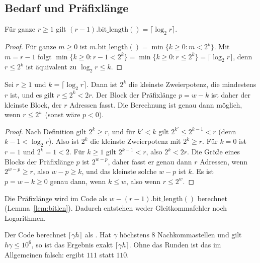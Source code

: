 \subsection{Bedarf und Präfixlänge}

\begin{lemma}
\label{lem:bitlen}
	Für ganze $r \ge 1$ gilt $(r-1).\mathrm{bit\_length}() = \lceil \log_2 r \rceil$.
\end{lemma}

\begin{proof}
	Für ganze $m \ge 0$ ist $m.\mathrm{bit\_length}() = \min\{k \ge 0 : m < 2^k\}$. Mit $m = r-1$ folgt $\min\{k \ge 0: r-1 < 2^k\} = \min\{k \ge 0 : r \le 2^k\} = \lceil \log_2 r \rceil$, denn $r \le 2^k$ ist äquivalent zu $\log_2 r \le k$.
\end{proof}

\begin{satz}
\label{satz:minimal}
	Sei $r \ge 1$ und $k = \lceil\log_2 r\rceil$. Dann ist $2^k$ die kleinste Zweierpotenz, die mindestens $r$ ist, und es gilt $r \le 2^k < 2r$. Der Block der Präfixlänge $p = w - k$ ist daher der kleinste Block, der $r$ Adressen fasst. Die Berechnung ist genau dann möglich, wenn $r \le 2^w$ (sonst wäre $p<0$).
\end{satz}

\begin{proof}
	Nach Definition gilt $2^k \ge r$, und für $k' < k$ gilt $2^{k'} \le 2^{k-1} < r$ (denn $k-1 < \log_2 r$). Also ist $2^k$ die kleinste Zweierpotenz mit $2^k \ge r$. Für $k = 0$ ist $r = 1$ und $2^k = 1 < 2$. Für $k\ge 1$ gilt $2^{k-1} < r$, also $2^k < 2r$. Die Größe eines Blocks der Präfixlänge $p$ ist $2^{w-p}$, daher fasst er genau dann $r$ Adressen, wenn $2^{w-p} \ge r$, also $w - p \ge k$, und das kleinste solche $w-p$ ist $k$. Es ist $p = w-k \ge 0$ genau dann, wenn $k \le w$, also wenn $r \le 2^w$.
\end{proof}

\begin{bemerkung}
	Die Präfixlänge wird im Code als $w - (r-1).\mathrm{bit\_length}()$ berechnet (Lemma~\ref{lem:bitlen}). Dadurch entstehen weder Gleitkommafehler noch Logarithmen.
\end{bemerkung}

\begin{lemma}
\label{lem:float}
	Der Code berechnet $\lceil\gamma h\rceil$ als . Hat $\gamma$ höchstens $8$ Nachkommastellen und gilt $h\gamma \le 10^6$, so ist das Ergebnis exakt $\lceil \gamma h \rceil$. Ohne das Runden ist das im Allgemeinen falsch:  ergibt $111$ statt $110$.
\end{lemma}

